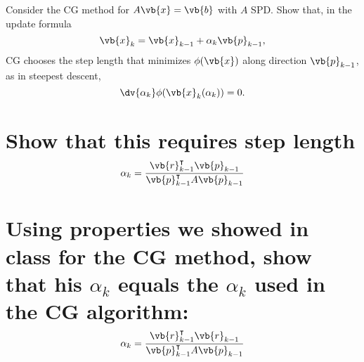 \documentclass[boxes,pages]{homework}
\newcommand{\tpose}[1]{#1^\intercal}
\begin{document}
\begin{problem}
Consider the CG method for $A\vb{x} = \vb{b}$ with $A$ SPD. Show that, in the update formula
\[
	\vb{x}_k = \vb{x}_{k-1} + \alpha_k\vb{p}_{k-1},
\]
CG chooses the step length that minimizes $\phi(\vb{x})$ along direction $\vb{p}_{k-1}$, as in steepest descent,
\[
	\dv{\alpha_k}\phi(\vb{x}_k(\alpha_k)) = 0.
\]
\begin{parts}
	\part{Show that this requires step length \[\alpha_k = \frac{\tpose{\vb{r}_{k-1}}\vb{p}_{k-1}}{\tpose{\vb{p}_{k-1}}A\vb{p}_{k-1}}\]}\label{part:1a}
	\part{Using properties we showed in class for the CG method, show that his $\alpha_k$ equals the $\alpha_k$ used in the CG algorithm: \[\alpha_k = \frac{\tpose{\vb{r}_{k-1}}\vb{r}_{k-1}}{\tpose{\vb{p}_{k-1}}A\vb{p}_{k-1}}\]}\label{part:1b}
\end{parts}
\end{problem}
\end{document}
